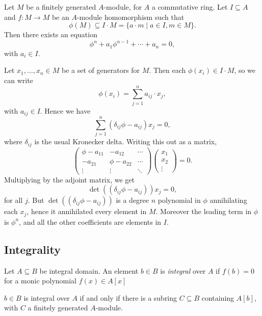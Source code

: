 \documentclass[12pt]{article}
\begin{document}
\begin{lemma}
	Let $M$ be a finitely generated $A$-module, for $A$ a commutative ring. Let $I \subseteq A$ and $f : M \to M$ be an $A$-module homomorphism such that
	\[
		\phi(M) \subseteq I \cdot M = \{a \cdot m \mid a \in I, m \in M\}.
	\]
	Then there exists an equation
	\[
	\phi^n + a_1 \phi^{n-1} + \cdots + a_n = 0,
	\]
	with $a_i \in I$.
\end{lemma}

\begin{proofbox}
	Let $x_1, \ldots, x_n \in M$ be a set of generators for $M$. Then each $\phi(x_i) \in I \cdot M$, so we can write
	\[
	\phi(x_i) = \sum_{j = 1}^n a_{ij} \cdot x_j,
	\]
	with $a_{ij} \in I$. Hence we have
	\[
	\sum_{j = 1}^n (\delta_{ij} \phi - a_{ij}) x_j = 0,
	\]
	where $\delta_{ij}$ is the usual Kronecker delta. Writing this out as a matrix,
	\[
	\begin{pmatrix}
		\phi - a_{11} & -a_{12} & \cdots \\
		-a_{21} & \phi - a_{22} & \cdots \\
		\vdots & \vdots & \ddots
	\end{pmatrix}
	\begin{pmatrix}
		x_1 \\ x_2 \\ \vdots
	\end{pmatrix} = 0.
	\]
	Multiplying by the adjoint matrix, we get
	\[
	\det((\delta_{ij} \phi - a_{ij})) x_j = 0,
	\]
	for all $j$. But $\det((\delta_{ij}\phi - a_{ij}))$ is a degree $n$ polynomial in $\phi$ annihilating each $x_j$, hence it annihilated every element in $M$. Moreover the leading term in $\phi$ is $\phi^{n}$, and all the other coefficients are elements in $I$.
\end{proofbox}

\subsection{Integrality}
\label{sub:integ}

\begin{definition}
	Let $A \subseteq B$ be integral domain. An element $b \in B$ is \emph{integral} over $A$ if $f(b) = 0$ for a monic polynomial $f(x) \in A[x]$
\end{definition}

\begin{proposition}
	$b \in B$ is integral over $A$ if and only if there is a subring $C \subseteq B$ containing $A[b]$, with $C$ a finitely generated $A$-module.
\end{proposition}
\end{document}
